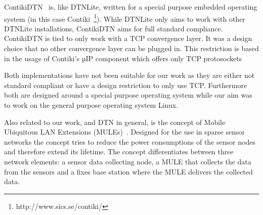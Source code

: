 ContikiDTN~\cite{contikidtn} is, like DTNLite, written for a special purpose
embedded operating system (in this case Contiki~\footnote{http://www.sics.se/contiki/}). While DTNLite only aims to work with
other DTNLite installations, ContikiDTN aims for full standard compliance.
ContikiDTN is tied to only work with a TCP convergence layer. It was a design
choice that no other convergence layer can be plugged in. This restriction is based in
the usage of Contiki's µIP component which offers only TCP protosockets

Both implementations have not been suitable for our work as they are either not
standard compliant or have a design restriction to only use TCP. Furthermore both
are designed around a special purpose operating system while our aim was to work
on the general purpose operating system Linux.

Also related to our work, and DTN in general, is the concept of Mobile
Ubiquitous LAN Extensions (MULEs)~\cite{mule}. Designed for the use in sparse
sensor networks the concept tries to reduce the power consumptions of the sensor
nodes and therefore extend its lifetime. The concept differentiates between
three network elements: a sensor data collecting node, a MULE that collects the
data from the sensors and a fixes base station where the MULE delivers the
collected data.
